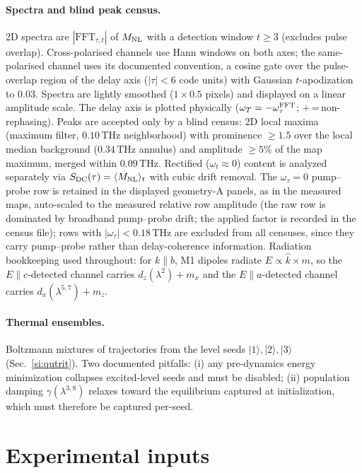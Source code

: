 \documentclass[11pt]{article}
\newcommand{\ket}[1]{|#1\rangle}
\newcommand{\Mnl}{M_{\rm NL}}
\begin{document}
\paragraph{Spectra and blind peak census.}  2D spectra are
$|\mathrm{FFT}_{\tau,t}|$ of $\Mnl$ with a detection window $t\geq3$
(excludes pulse overlap).  Cross-polarised channels use Hann windows on
both axes; the same-polarised channel uses its documented convention, a
cosine gate over the pulse-overlap region of the delay axis
($|\tau|<6$ code units) with Gaussian $t$-apodization to $0.03$.
Spectra are lightly smoothed ($1\times0.5$ pixels) and displayed on a
linear amplitude scale.  The delay axis is
plotted physically ($\omega_T=-\omega_\tau^{\rm FFT}$;
$+$\,=\,non-rephasing).  Peaks are accepted only by a blind census:
2D local maxima (maximum filter, $0.10$\,THz neighborhood) with
prominence $\geq1.5$ over the local median background
($0.34$\,THz annulus) and amplitude $\geq5\%$ of the map maximum,
merged within $0.09$\,THz.  Rectified ($\omega_t\approx0$) content is
analyzed separately via $S_{\rm DC}(\tau)=\langle\Mnl\rangle_t$ with
cubic drift removal.  The $\omega_\tau=0$ pump--probe row is retained
in the displayed geometry-A panels, as in the measured maps, auto-scaled
to the measured relative row amplitude (the raw row is dominated by
broadband pump--probe drift; the applied factor is recorded in the
census file); rows with $|\omega_\tau|<0.18$\,THz are excluded from
all censuses, since they carry pump--probe rather than delay-coherence
information.  Radiation bookkeeping used throughout: for
$k\parallel b$, M1 dipoles radiate $E\propto\hat k\times m$, so the
$E\parallel c$-detected channel carries $d_z(\lambda^2)+m_x$ and the
$E\parallel a$-detected channel carries $d_x(\lambda^{5,7})+m_z$.

\paragraph{Thermal ensembles.}  Boltzmann mixtures of trajectories from
the level seeds $\ket1,\ket2,\ket3$ (Sec.~\ref{si:qutrit}).  Two
documented pitfalls: (i) any pre-dynamics energy minimization collapses
excited-level seeds and must be disabled; (ii) population damping
$\gamma(\lambda^{3,8})$ relaxes toward the equilibrium captured at
initialization, which must therefore be captured per-seed.

\section{Experimental inputs}
\label{si:exp}
\end{document}
